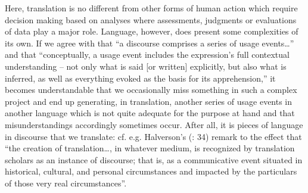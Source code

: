 \documentclass[output=paper]{LSP/langsci}
\begin{document}
   
  Here, translation is no different from other forms of human action which require decision making based on analyses where assessments, judgments or evaluations of data play a major role. Language, however, does present some complexities of its own. If we agree with \citet[457--458]{Langacker2008} that ``a discourse comprises a series of usage events\ldots'' and that ``conceptually, a usage event includes the expression's full contextual understanding -- not only what is said [or written] explicitly, but also what is inferred, as well as everything evoked as the basis for its apprehension,'' it becomes understandable that we occasionally miss something in such a complex project and end up generating, in translation, another series of usage events in another language which is not quite adequate for the purpose at hand and that misunderstandings accordingly sometimes occur. After all, it is pieces of language in discourse that we translate: cf. e.g. Halverson's (\citeyear{Halverson2013}: 34) remark to the effect that ``the creation of translation\ldots, in whatever medium, is recognized by translation scholars as an instance of discourse; that is, as a communicative event situated in historical, cultural, and personal circumstances and impacted by the particulars of those very real circumstances''.
\end{document}
